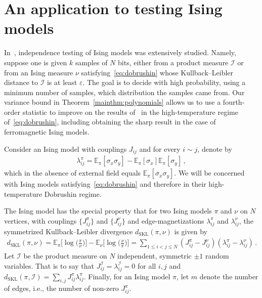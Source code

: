 \documentclass[reqno,11pt]{amsart}
\numberwithin{equation}{section}
\renewcommand{\epsilon}{\varepsilon}
\theoremstyle{definition}{
\newtheorem{example}[theorem]{Example}
\newtheorem{definition}[theorem]{Definition}
\newtheorem*{definition*}{Definition}
\newtheorem{problem}[theorem]{Problem}
\newtheorem{question}[theorem]{Question}
\newtheorem{remark}[theorem]{Remark}
}
\renewcommand{\epsilon}{\varepsilon}
\begin{document}
\section{An application to testing Ising models}\label{sec:applications}
In~\cite{DDK}, independence testing of Ising models was extensively studied. Namely, suppose one is given $k$ samples of $N$ bits, either from a product measure $\mathcal I$ or from an Ising measure $\nu$ satisfying~\eqref{eq:dobrushin} whose Kullback--Leibler distance to $\mathcal I$ is at least $\epsilon$. The goal is to decide with high probability, using a minimum number of samples, which distribution the samples came from. Our variance bound in Theorem~\ref{mainthm:polynomials} allows us to use a fourth-order statistic to improve on the results of~\cite{DDK} in the high-temperature regime of~\eqref{eq:dobrushin}, including obtaining the sharp result in the case of ferromagnetic Ising models. 

Consider an Ising model with couplings $J_{ij}$ and for every $i\sim j$, denote by 
\begin{align*}
\lambda_{ij}^{\pi} = \mathbb E_{\pi} [\sigma_x \sigma_y]- \mathbb E_{\pi}[\sigma_x] \mathbb E_{\pi} [\sigma_y]\,,
\end{align*}
which in the absence of external field equals $\mathbb E_{\pi} [\sigma_x \sigma_y]$. We will be concerned with Ising models satisfying~\eqref{eq:dobrushin} and therefore in their high-temperature Dobrushin regime.

The Ising model has the special property that for two Ising models $\pi$ and $\nu$ on $N$ vertices, with couplings $\{J_{ij}^\pi\}$ and $\{J_{ij}^\nu\}$ and edge-magnetizations $\lambda_{ij}^\pi$ and $\lambda_{ij}^\nu$, the symmetrized Kullback--Leibler divergence $d_{\mathrm{SKL}}(\pi,\nu)$ is given by 
\begin{align*}
d_{\mathrm{SKL}}(\pi,\nu) = \mathbb E_{\pi}\Big[\log\Big(\frac \pi \nu\Big)\Big] - \mathbb E_{\nu} \Big[\log \Big(\frac \nu \pi \Big) \Big]=\sum_{1\leq i<j\leq N} (J_{ij}^\pi-J_{ij}^\nu) (\lambda_{ij}^\pi - \lambda_{ij}^\nu)\,.
\end{align*} 
Let $\mathcal I$ be the product measure on $N$ independent, symmetric $\pm 1$ random variables. That is to say that $J_{ij}^{\mathcal I}=\lambda_{ij}^{\mathcal I}=0$ for all $i,j$ and $d_{\mathrm{SKL}}(\pi, \mathcal I) = \sum_{i, j} J_{ij}^\pi \lambda_{ij}^\pi$. Finally, for an Ising model $\pi$, let $m$ denote the number of edges, i.e., the number of non-zero $J_{ij}^\pi$. 
\end{document}
